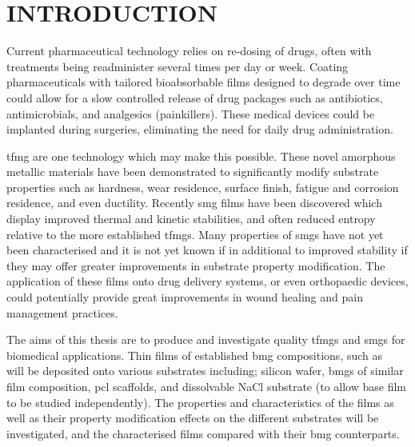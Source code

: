 \documentclass[a4paper,12pt,oneside]{report}%
\begin{document}

\chapter{INTRODUCTION}
\glsresetall
{}
Current pharmaceutical technology relies on re-dosing of drugs, often with treatments being readminister several times per day or week. Coating pharmaceuticals with tailored bioabsorbable films designed to degrade over time could allow for a slow controlled release of drug packages such as antibiotics, antimicrobials, and analgesics (painkillers). These medical devices could be implanted during surgeries, eliminating the need for daily drug administration. 

\Gls{tfmg} are one technology which may make this possible. These novel amorphous metallic materials have been demonstrated to significantly modify substrate properties such as hardness, wear residence, surface finish, fatigue and corrosion residence, and even ductility. Recently \gls{smg} films have been discovered which display improved thermal and kinetic stabilities, and often reduced entropy relative to the more established \gls{tfmg}s. Many properties of \gls{smg}s have not yet been characterised and it is not yet known if in additional to improved stability if they may offer greater improvements in substrate property modification. The application of these films onto drug delivery systems, or even orthopaedic devices, could potentially provide great improvements in wound healing and pain management practices.

The aims of this thesis are to produce and investigate quality \gls{tfmg}s and \gls{smg}s for biomedical applications. Thin films of established \gls{bmg} compositions, such as \MgZnCa~ will be deposited onto various substrates including; silicon wafer, \gls{bmg}s of similar film composition, \Gls{pcl} scaffolds, and dissolvable NaCl substrate (to allow base film to be studied independently). The properties and characteristics of the films as well as their property modification effects on the different substrates will be investigated, and the characterised films compared with their \gls{bmg} counterparts. 
\end{document}
